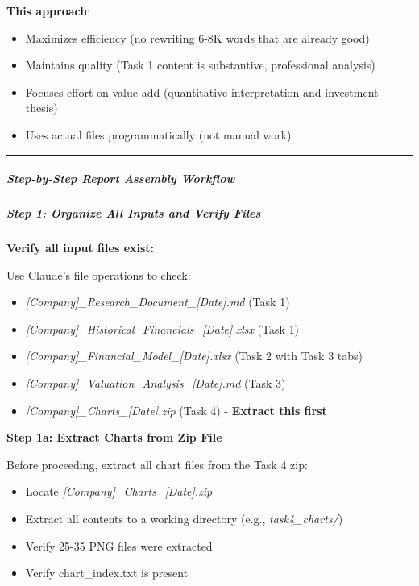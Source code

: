 \documentclass[11pt]{article}
\begin{document}
\textbf{This approach}:

\begin{itemize}[leftmargin=*,itemsep=2pt,topsep=2pt]
\item {} Maximizes efficiency (no rewriting 6-8K words that are already good)
\item {} Maintains quality (Task 1 content is substantive, professional analysis)
\item {} Focuses effort on value-add (quantitative interpretation and investment thesis)
\item {} Uses actual files programmatically (not manual work)
\end{itemize}

\vspace{0.5em}\hrule\vspace{0.5em}

\subparagraph{Step-by-Step Report Assembly Workflow}\mbox{}\par

\subparagraph{Step 1: Organize All Inputs and Verify Files}\mbox{}\par

\textbf{Verify all input files exist:}


Use Claude's file operations to check:

\begin{itemize}[leftmargin=*,itemsep=2pt,topsep=2pt]
\item {} \emph{[Company]\_\allowbreak{}Research\_\allowbreak{}Document\_\allowbreak{}[Date].md} (Task 1)
\item {} \emph{[Company]\_\allowbreak{}Historical\_\allowbreak{}Financials\_\allowbreak{}[Date].xlsx} (Task 1)
\item {} \emph{[Company]\_\allowbreak{}Financial\_\allowbreak{}Model\_\allowbreak{}[Date].xlsx} (Task 2 with Task 3 tabs)
\item {} \emph{[Company]\_\allowbreak{}Valuation\_\allowbreak{}Analysis\_\allowbreak{}[Date].md} (Task 3)
\item {} \emph{[Company]\_\allowbreak{}Charts\_\allowbreak{}[Date].zip} (Task 4) - \textbf{Extract this first}
\end{itemize}

\textbf{Step 1a: Extract Charts from Zip File}


Before proceeding, extract all chart files from the Task 4 zip:

\begin{itemize}[leftmargin=*,itemsep=2pt,topsep=2pt]
\item {} Locate \emph{[Company]\_\allowbreak{}Charts\_\allowbreak{}[Date].zip}
\item {} Extract all contents to a working directory (e.g., \emph{task4\_\allowbreak{}charts/})
\item {} Verify 25-35 PNG files were extracted
\item {} Verify chart\_\allowbreak{}index.txt is present
\end{itemize}
\end{document}
